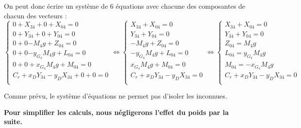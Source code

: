 \documentclass[11pt,oneside]{article}
\begin{document}
On peut donc écrire un système de 6 équations avec chacune des composantes de chacun des vecteurs :
$$
\left\{
\begin{array}{l}
{0}+{X_{34}}+{0}+{X_{04}}=0 \\
{0}+{Y_{34}}+{0}+{Y_{04}}=0 \\
{0}+{0}{-M_4g}+{Z_{04}}=0 \\
{0}+{0}{-y_{G_4}M_4g}+{L_{04}}=0 \\
{0}+{0}+{x_{G_4}M_4g}+{M_{04}}=0 \\
{C_r}+{x_DY_{34}-y_DX_{34}}+{0}+{0}=0 \\
\end{array}
\right.
\Longleftrightarrow
\left\{
\begin{array}{l}
{X_{34}}+{X_{04}}=0 \\
{Y_{34}}+{Y_{04}}=0 \\
{-M_4g}+{Z_{04}}=0 \\
{-y_{G_4}M_4g}+{L_{04}}=0 \\
{x_{G_4}M_4g}+{M_{04}}=0 \\
{C_r}+{x_DY_{34}-y_DX_{34}}=0 \\
\end{array}
\right.
\Longleftrightarrow
\left\{
\begin{array}{l}
{X_{34}}+{X_{04}}=0 \\
{Y_{34}}+{Y_{04}}=0 \\
{Z_{04}}=M_4g \\
{L_{04}}={y_{G_4}M_4g}\\
{M_{04}}=- {x_{G_4}M_4g}\\
{C_r}+{x_DY_{34}-y_DX_{34}}=0 \\
\end{array}
\right.
$$

Comme prévu, le système d'équations ne permet pas d'isoler les inconnues.

\textbf{Pour simplifier les calculs, nous négligerons l'effet du poids par la suite.}
\end{document}
